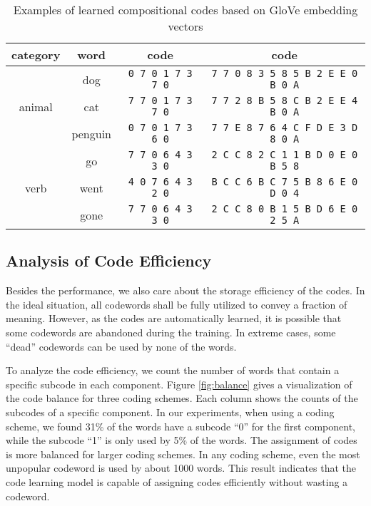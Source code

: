 \documentclass{article} \usepackage{iclr2018_conference_review,times}
\begin{document}
\begin{table}[h]
\begin{center}
    \begin{tabular}{c|c|c|c}
    \hline \hline
    {\bf category}  & {\bf word} & {\bf  code}  & {\bf  code} \\
    \hline
    & dog & \texttt{0 7 0 1 7 3 7 0} & \texttt{7 7 0 8 3 5 8 5 B 2 E E 0 B 0 A} \\
    animal & cat & \texttt{7 7 0 1 7 3 7 0} & \texttt{7 7 2 8 B 5 8 C B 2 E E 4 B 0 A}\\
      & penguin & \texttt{0 7 0 1 7 3 6 0} & \texttt{7 7 E 8 7 6 4 C F D E 3 D 8 0 A} \\
    \hline
    & go & \texttt{7 7 0 6 4 3 3 0} & \texttt{2 C C 8 2 C 1 1 B D 0 E 0 B 5 8} \\
    verb & went & \texttt{4 0 7 6 4 3 2 0} & \texttt{B C C 6 B C 7 5 B 8 6 E 0 D 0 4} \\
      & gone & \texttt{7 7 0 6 4 3 3 0} & \texttt{2 C C 8 0 B 1 5 B D 6 E 0 2 5 A} \\
    \hline \hline
    \end{tabular}
    \caption{Examples of learned compositional codes based on GloVe embedding vectors}
    \label{table:examples}
\end{center}
\end{table}


\subsection{Analysis of Code Efficiency}
Besides the performance, we also care about the storage efficiency of the codes. In the ideal situation, all codewords shall be fully utilized to convey a fraction of meaning. However, as the codes are automatically learned, it is possible that some codewords are abandoned during the training. In extreme cases, some ``dead'' codewords can be used by none of the words. 

To analyze the code efficiency, we count the number of words that contain a specific subcode in each component. Figure \ref{fig:balance} gives a visualization of the code balance for three coding schemes. Each column shows the counts of the subcodes of a specific component. In our experiments, when using a  coding scheme, we found 31\% of the words have a subcode ``0'' for the first component, while the subcode ``1'' is only used by 5\% of the words. The assignment of codes is more balanced for larger coding schemes. In any coding scheme, even the most unpopular codeword is used by about 1000 words. This result indicates that the code learning model is capable of assigning codes efficiently without wasting a codeword.
\end{document}
